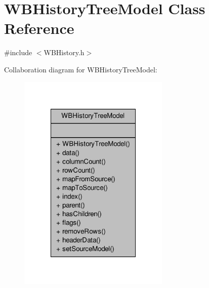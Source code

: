 \hypertarget{class_w_b_history_tree_model}{\section{W\-B\-History\-Tree\-Model Class Reference}
\label{df/de6/class_w_b_history_tree_model}
}


{\ttfamily \#include $<$W\-B\-History.\-h$>$}



Collaboration diagram for W\-B\-History\-Tree\-Model\-:
\nopagebreak
\begin{figure}[H]
\begin{center}
\leavevmode
\includegraphics[width=204pt]{d9/d06/class_w_b_history_tree_model__coll__graph}
\end{center}
\end{figure}
